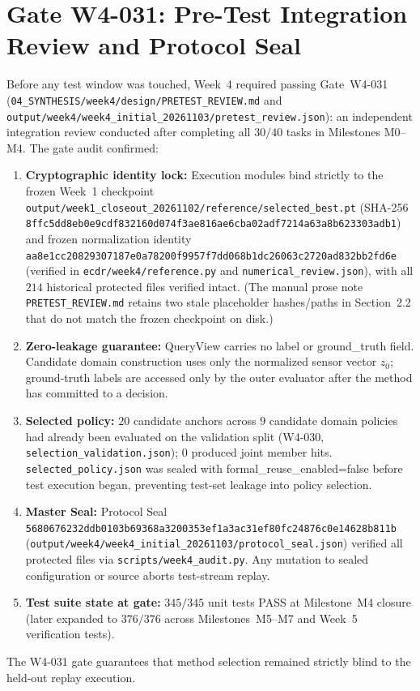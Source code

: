 \documentclass[11pt,oneside,a4paper]{report}
\newcommand{\code}[1]{{\small\upshape\ttfamily #1}}
\newcommand{\pathcode}[1]{{\small\upshape\ttfamily\nolinkurl{#1}}}
\theoremstyle{remark}
\begin{document}
\section{Gate W4-031: Pre-Test Integration Review and Protocol Seal}
Before any test window was touched, Week~4 required passing Gate~\code{W4-031} (\pathcode{04_SYNTHESIS/week4/design/PRETEST_REVIEW.md} and \pathcode{output/week4/week4_initial_20261103/pretest_review.json}): an independent integration review conducted after completing all $30/40$ tasks in Milestones M0--M4. The gate audit confirmed:
\begin{enumerate}[leftmargin=1.5em]
  \item \textbf{Cryptographic identity lock:} Execution modules bind strictly to the frozen Week~1 checkpoint \pathcode{output/week1_closeout_20261102/reference/selected_best.pt} (SHA-256 \pathcode{8ffc5dd8eb0e9cdf832160d074f3ae816ae6cba02adf7214a63a8b623303adb1}) and frozen normalization identity \pathcode{aa8e1cc20829307187e0a78200f9957f7dd068b1dc26063c2720ad832bb2fd6e} (verified in \pathcode{ecdr/week4/reference.py} and \pathcode{numerical_review.json}), with all $214$ historical protected files verified intact. (The manual prose note \pathcode{PRETEST_REVIEW.md} retains two stale placeholder hashes/paths in Section~2.2 that do not match the frozen checkpoint on disk.)
  \item \textbf{Zero-leakage guarantee:} \code{QueryView} carries no \code{label} or \code{ground\_truth} field. Candidate domain construction uses only the normalized sensor vector $z_0$; ground-truth labels are accessed only by the outer evaluator after the method has committed to a decision.
  \item \textbf{Selected policy:} $20$ candidate anchors across $9$ candidate domain policies had already been evaluated on the validation split (\code{W4-030}, \pathcode{selection_validation.json}); $0$ produced joint member hits. \pathcode{selected_policy.json} was sealed with \code{formal\_reuse\_enabled=false} before test execution began, preventing test-set leakage into policy selection.
  \item \textbf{Master Seal:} Protocol Seal \pathcode{5680676232ddb0103b69368a3200353ef1a3ac31ef80fc24876c0e14628b811b} (\pathcode{output/week4/week4_initial_20261103/protocol_seal.json}) verified all protected files via \pathcode{scripts/week4_audit.py}. Any mutation to sealed configuration or source aborts test-stream replay.
  \item \textbf{Test suite state at gate:} $345/345$ unit tests PASS at Milestone~M4 closure (later expanded to $376/376$ across Milestones~M5--M7 and Week~5 verification tests).
\end{enumerate}
The \code{W4-031} gate guarantees that method selection remained strictly blind to the held-out replay execution.
\end{document}
